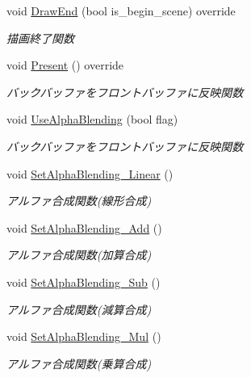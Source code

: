 \begin{DoxyCompactItemize}
void \mbox{\hyperlink{class_renderer_direct_x9_a5f934597020f77dc9cf729acfb13a830}{Draw\+End}} (bool is\+\_\+begin\+\_\+scene) override
\begin{DoxyCompactList}\small\item\em 描画終了関数 \end{DoxyCompactList}\item 
void \mbox{\hyperlink{class_renderer_direct_x9_a77dbc76e8adbe4f9ee41c5f09e5ebe81}{Present}} () override
\begin{DoxyCompactList}\small\item\em バックバッファをフロントバッファに反映関数 \end{DoxyCompactList}\item 
void \mbox{\hyperlink{class_renderer_direct_x9_aa555dda63bdc0f4dfc28ac506d6e8d60}{Use\+Alpha\+Blending}} (bool flag)
\begin{DoxyCompactList}\small\item\em バックバッファをフロントバッファに反映関数 \end{DoxyCompactList}\item 
void \mbox{\hyperlink{class_renderer_direct_x9_abfb5264cbb0bf3bacc7b4ec416ddc05a}{Set\+Alpha\+Blending\+\_\+\+Linear}} ()
\begin{DoxyCompactList}\small\item\em アルファ合成関数(線形合成) \end{DoxyCompactList}\item 
void \mbox{\hyperlink{class_renderer_direct_x9_aa552107a3d5f8a61347fe10741fd04a3}{Set\+Alpha\+Blending\+\_\+\+Add}} ()
\begin{DoxyCompactList}\small\item\em アルファ合成関数(加算合成) \end{DoxyCompactList}\item 
void \mbox{\hyperlink{class_renderer_direct_x9_a6ddbb9f801ef6b2c86ec5cd4e97b317b}{Set\+Alpha\+Blending\+\_\+\+Sub}} ()
\begin{DoxyCompactList}\small\item\em アルファ合成関数(減算合成) \end{DoxyCompactList}\item 
void \mbox{\hyperlink{class_renderer_direct_x9_a75dbeaa680610e655c6ff202591f50d7}{Set\+Alpha\+Blending\+\_\+\+Mul}} ()
\begin{DoxyCompactList}\small\item\em アルファ合成関数(乗算合成) \end{DoxyCompactList}\item 

\end{DoxyCompactItemize}
